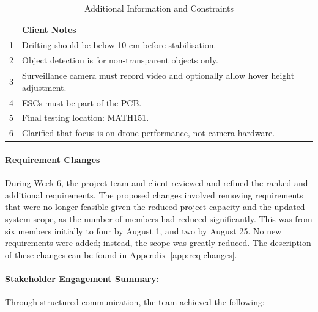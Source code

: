\begin{table}[H]
\centering
\caption{Additional Information and Constraints}
\begin{tabular}{|p{0.5cm}|p{13cm}|}
\hline
 & \textbf{Client Notes} \\ \hline
1 & Drifting should be below 10 cm before stabilisation. \\ \hline
2 & Object detection is for non-transparent objects only. \\ \hline
3 & Surveillance camera must record video and optionally allow hover height adjustment. \\ \hline
4 & ESCs must be part of the PCB. \\ \hline
5 & Final testing location: MATH151. \\ \hline
6 & Clarified that focus is on drone performance, not camera hardware. \\ \hline
\end{tabular}
\end{table}

\paragraph{\textbf{Requirement Changes}} \leavevmode

During Week 6, the project team and client reviewed and refined the ranked and additional requirements.  The proposed changes involved removing requirements that were no longer feasible given the reduced project capacity and the updated system scope, as the number of members had reduced significantly. This was from six members initially to four by August 1, and two by August 25. No new requirements were added; instead, the scope was greatly reduced. The description of these changes can be found in Appendix~\ref{app:req-changes}.

\pagebreak
\paragraph{\textbf{Stakeholder Engagement Summary:}} \leavevmode

Through structured communication, the team achieved the following: \

